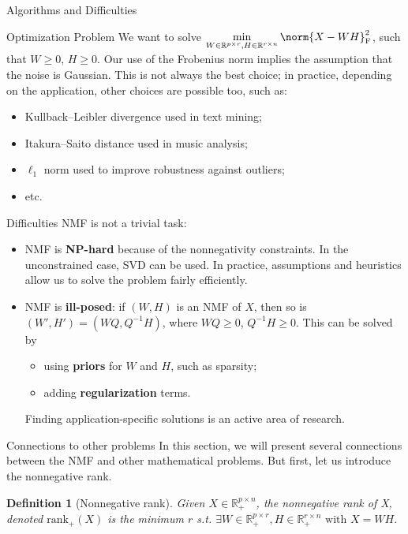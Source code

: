 \documentclass[final]{beamer}
\newlength{\onecolwid}
\newtheorem{defn}[thm]{Definition}
\begin{document}
\begin{frame}
\begin{columns}[t]
\begin{column}{\onecolwid}
\begin{exampleblock}{Algorithms and Difficulties}
\vspace{0.4cm}
\begin{block}{Optimization Problem}
We want to solve \(\displaystyle \min_{W \in \mathbb{R}^{p \times r}, H \in \mathbb{R}^{r \times n}} \norm{X - WH}^2_{\textnormal{F}}\), such that \(W \geqslant 0\), \(H \geqslant 0\).
Our use of the Frobenius norm implies the assumption that the noise is Gaussian.
This is not always the best choice; in practice, depending on the application, other choices are possible too, such as:
\begin{itemize}
    \item Kullback--Leibler divergence used in text mining;
    \item Itakura--Saito distance used in music analysis;
    \item \(\ell_1\) norm used to improve robustness against outliers;
    \item etc.
\end{itemize}
\end{block}
\begin{block}{Difficulties}
NMF is not a trivial task:
\begin{itemize}
    \item NMF is \textbf{NP-hard} because of the nonnegativity constraints.
    In the unconstrained case, SVD can be used.
    In practice, assumptions and heuristics allow us to solve the problem fairly efficiently.
    \item NMF is \textbf{ill-posed}: if \((W, H)\) is an NMF of \(X\), then so is \((W', H') = (WQ, Q^{-1}H)\), where \(WQ \geqslant 0\), \(Q^{-1}H \geqslant 0\).
    This can be solved by
    \begin{itemize}
        \item using \textbf{priors} for \(W\) and \(H\), such as sparsity;
        \item adding \textbf{regularization} terms.
    \end{itemize}
    Finding application-specific solutions is an active area of research.
\end{itemize}
\end{block}
\end{exampleblock}

\begin{exampleblock}{Connections to other problems}
In this section, we will present several connections between the NMF and other mathematical problems. But first, let us introduce the nonnegative rank.
\begin{defn}[Nonnegative rank]
Given $X \in \mathbb{R}_+^{p\times n}$, the nonnegative rank of X, denoted $\text{rank}_+(X)$ is the minimum $r$ s.t. $\exists W \in \mathbb{R}_+^{p\times r}, H \in \mathbb{R}_+^{r\times n} \text{ with } X = WH$.
\end{defn}


\end{exampleblock}
\end{column}
\end{columns}
\end{frame}
\end{document}
